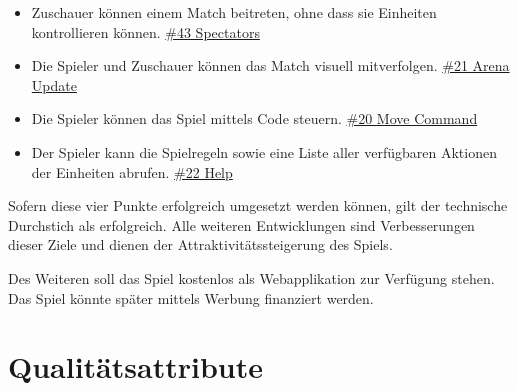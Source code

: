 \documentclass[11pt,a4paper]{scrartcl}
\let\oldsection\section
\renewcommand\section{\clearpage\oldsection}
\begin{document}
\begin{itemize}
  \item Zuschauer können einem Match beitreten, ohne dass sie Einheiten kontrollieren können. \href{https://dev.azure.com/schaumic/darwin/_workitems/edit/43/}{\#43 Spectators}
  \item Die Spieler und Zuschauer können das Match visuell mitverfolgen. \href{https://dev.azure.com/schaumic/darwin/_workitems/edit/21/}{\#21 Arena Update}
  \item Die Spieler können das Spiel mittels Code steuern. \href{https://dev.azure.com/schaumic/darwin/_workitems/edit/20/}{\#20 Move Command}
  \item Der Spieler kann die Spielregeln sowie eine Liste aller verfügbaren Aktionen der Einheiten abrufen. \href{https://dev.azure.com/schaumic/darwin/_workitems/edit/22/}{\#22 Help}
\end{itemize}

Sofern diese vier Punkte erfolgreich umgesetzt werden können, gilt der technische Durchstich als erfolgreich. Alle weiteren Entwicklungen sind Verbesserungen dieser Ziele und dienen der Attraktivitätssteigerung des Spiels.

Des Weiteren soll das Spiel kostenlos als Webapplikation zur Verfügung stehen. Das Spiel könnte später mittels Werbung finanziert werden.

\section{Qualitätsattribute}
\end{document}
